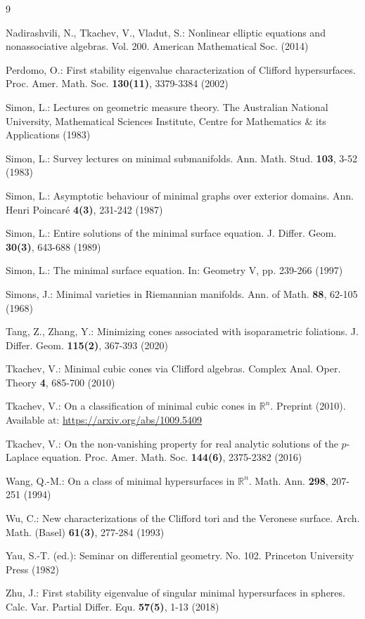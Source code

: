 \documentclass[pdflatex,sn-mathphys-num]{sn-jnl}%
\theoremstyle{thmstyleone}%
\theoremstyle{thmstyletwo}%
\theoremstyle{thmstylethree}%
\begin{document}
\begin{thebibliography}{9}
	
	Nadirashvili, N., Tkachev, V., Vladut, S.: Nonlinear elliptic equations and nonassociative algebras. Vol. 200. American Mathematical Soc. (2014)
	
	Perdomo, O.: First stability eigenvalue characterization of Clifford hypersurfaces. Proc. Amer. Math. Soc. \textbf{130(11)}, 3379-3384 (2002)
	
	Simon, L.: Lectures on geometric measure theory. The Australian National University, Mathematical Sciences Institute, Centre for Mathematics \& its Applications (1983)
	
	Simon, L.: Survey lectures on minimal submanifolds. Ann. Math. Stud. \textbf{103}, 3-52 (1983)
	
	Simon, L.: Asymptotic behaviour of minimal graphs over exterior domains. Ann. Henri Poincar\'e \textbf{4(3)}, 231-242 (1987)
	
	Simon, L.: Entire solutions of the minimal surface equation. J. Differ. Geom. \textbf{30(3)}, 643-688 (1989)
	
	Simon, L.: The minimal surface equation. In: Geometry V, pp. 239-266 (1997)
	
	Simons, J.: Minimal varieties in Riemannian manifolds. Ann. of Math. \textbf{88}, 62-105 (1968)
	
	Tang, Z., Zhang, Y.: Minimizing cones associated with isoparametric foliations. J. Differ. Geom. \textbf{115(2)}, 367-393 (2020)
	
	Tkachev, V.: Minimal cubic cones via Clifford algebras. Complex Anal. Oper. Theory \textbf{4}, 685-700 (2010)
	
	Tkachev, V.: On a classification of minimal cubic cones in $\mathbb{R}^{n}$. Preprint (2010). Available at: \url{https://arxiv.org/abs/1009.5409}
	
	Tkachev, V.: On the non-vanishing property for real analytic solutions of the $p$-Laplace equation. Proc. Amer. Math. Soc. \textbf{144(6)}, 2375-2382 (2016)
	
	Wang, Q.-M.: On a class of minimal hypersurfaces in $\mathbb{R}^n$. Math. Ann. \textbf{298}, 207-251 (1994)
	
	Wu, C.: New characterizations of the Clifford tori and the Veronese surface. Arch. Math. (Basel) \textbf{61(3)}, 277-284 (1993)
	
	Yau, S.-T. (ed.): Seminar on differential geometry. No. 102. Princeton University Press (1982)
	
	Zhu, J.: First stability eigenvalue of singular minimal hypersurfaces in spheres. Calc. Var. Partial Differ. Equ. \textbf{57(5)}, 1-13 (2018)
	
\end{thebibliography}
\end{document}
